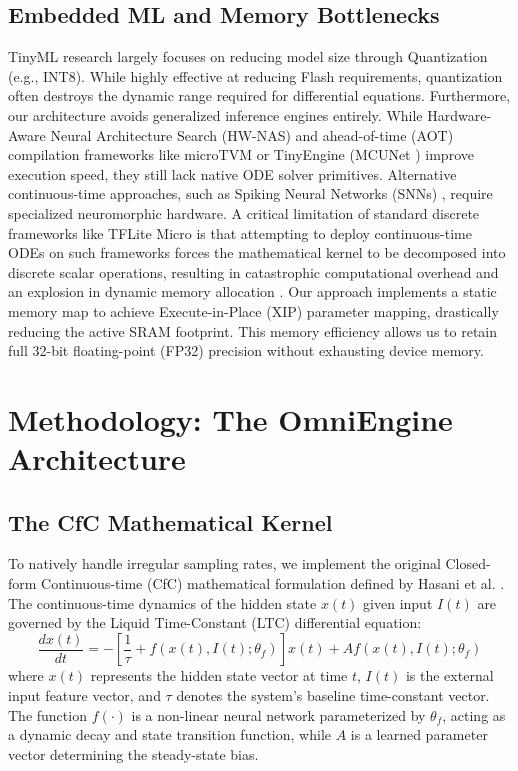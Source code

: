 \documentclass[conference]{IEEEtran}
\begin{document}
\subsection{Embedded ML and Memory Bottlenecks}
TinyML research \cite{warden2020tinyml} largely focuses on reducing model size through Quantization (e.g., INT8). While highly effective at reducing Flash requirements, quantization often destroys the dynamic range required for differential equations. Furthermore, our architecture avoids generalized inference engines entirely. While Hardware-Aware Neural Architecture Search (HW-NAS) \cite{cai2018proxylessnas} and ahead-of-time (AOT) compilation frameworks like microTVM or TinyEngine (MCUNet \cite{lin2020mcunet}) improve execution speed, they still lack native ODE solver primitives. Alternative continuous-time approaches, such as Spiking Neural Networks (SNNs) \cite{roy2019towards}, require specialized neuromorphic hardware. A critical limitation of standard discrete frameworks like TFLite Micro \cite{david2021tflitemicro} is that attempting to deploy continuous-time ODEs on such frameworks forces the mathematical kernel to be decomposed into discrete scalar operations, resulting in catastrophic computational overhead and an explosion in dynamic memory allocation \cite{banbury2021mlperf}. Our approach implements a static memory map to achieve Execute-in-Place (XIP) parameter mapping, drastically reducing the active SRAM footprint. This memory efficiency allows us to retain full 32-bit floating-point (FP32) precision without exhausting device memory.

\section{Methodology: The OmniEngine Architecture}

\subsection{The CfC Mathematical Kernel}
To natively handle irregular sampling rates, we implement the original Closed-form Continuous-time (CfC) mathematical formulation defined by Hasani et al. \cite{hasani2022closed}. The continuous-time dynamics of the hidden state $x(t)$ given input $I(t)$ are governed by the Liquid Time-Constant (LTC) differential equation:
\begin{equation}
\frac{dx(t)}{dt} = -\left[\frac{1}{\tau} + f(x(t), I(t); \theta_f)\right] x(t) + A f(x(t), I(t); \theta_f)
\label{eq:ltc_ode}
\end{equation}
where $x(t)$ represents the hidden state vector at time $t$, $I(t)$ is the external input feature vector, and $\tau$ denotes the system's baseline time-constant vector. The function $f(\cdot)$ is a non-linear neural network parameterized by $\theta_f$, acting as a dynamic decay and state transition function, while $A$ is a learned parameter vector determining the steady-state bias.
\end{document}
